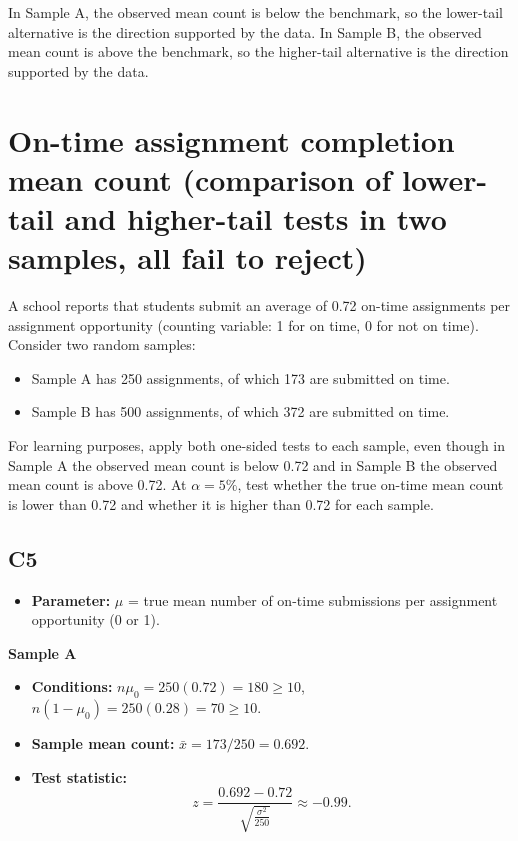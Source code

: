 
In Sample A, the observed mean count is below the benchmark, so the lower-tail alternative is the direction supported by the data. In Sample B, the observed mean count is above the benchmark, so the higher-tail alternative is the direction supported by the data.

\section{On-time assignment completion mean count (comparison of lower-tail and higher-tail tests in two samples, all fail to reject)}
A school reports that students submit an average of 0.72 on-time assignments per assignment opportunity (counting variable: 1 for on time, 0 for not on time). Consider two random samples:
\begin{itemize}
	\item Sample A has 250 assignments, of which 173 are submitted on time.
	\item Sample B has 500 assignments, of which 372 are submitted on time.
\end{itemize}
For learning purposes, apply both one-sided tests to each sample, even though in Sample A the observed mean count is below 0.72 and in Sample B the observed mean count is above 0.72. At \(\alpha=5\%\), test whether the true on-time mean count is lower than 0.72 and whether it is higher than 0.72 for each sample.

\subsection*{C5}
\begin{itemize}
	\item \textbf{Parameter:} \(\mu\) = true mean number of on-time submissions per assignment opportunity (0 or 1).
\end{itemize}

\textbf{Sample A}

\begin{itemize}
	\item \textbf{Conditions:} \(n\mu_0=250(0.72)=180\ge10\), \(n(1-\mu_0)=250(0.28)=70\ge10\).
	\item \textbf{Sample mean count:} \(\bar x=173/250=0.692\).
	\item \textbf{Test statistic:}
	\[
	z=\frac{0.692-0.72}{\sqrt{\frac{\sigma^2}{250}}}\approx -0.99.
	\]
\end{itemize}

